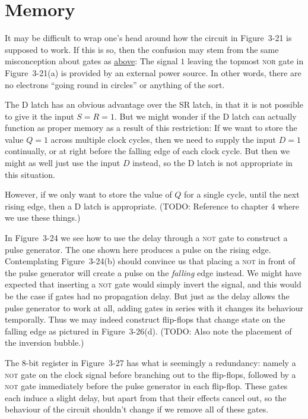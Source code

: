 \documentclass[article, a4paper, 11pt, oneside]{memoir}
\numberwithin{equation}{chapter}
\newcommand{\gate}{\textsc}
\newcommand{\gateNOT}{\gate{not}}
\newcommand{\gateNOR}{\gate{nor}}
\newcommand{\descref}[2]{\hyperref[#1]{#2}}
\begin{document}
\section{Memory}

\begin{notelist}
\item[Latches]
It may be difficult to wrap one's head around how the circuit in Figure~3-21 is supposed to work. If this is so, then the confusion may stem from the same misconception about gates as \descref{note:current-in-out}{above}: The signal $1$ leaving the topmost \gateNOR{} gate in Figure~3-21(a) is provided by an external power source. In other words, there are no electrons \enquote{going round in circles} or anything of the sort.

\item[Usefulness of D latches]
The D latch has an obvious advantage over the SR latch, in that it is not possible to give it the input $S = R = 1$. But we might wonder if the D latch can actually function as proper memory as a result of this restriction: If we want to store the value $Q = 1$ across multiple clock cycles, then we need to supply the input $D = 1$ continually, or at right before the falling edge of each clock cycle. But then we might as well just use the input $D$ instead, so the D latch is not appropriate in this situation.

However, if we only want to store the value of $Q$ for a single cycle, until the next rising edge, then a D latch is appropriate. (TODO: Reference to chapter 4 where we use these things.)

\item[Adding a \gateNOT{} gate to a flip-flop]
In Figure~3-24 we see how to use the delay through a \gateNOT{} gate to construct a pulse generator. The one shown here produces a pulse on the rising edge. Contemplating Figure~3-24(b) should convince us that placing a \gateNOT{} in front of the pulse generator will create a pulse on the \emph{falling} edge instead. We might have expected that inserting a \gateNOT{} gate would simply invert the signal, and this would be the case if gates had no propagation delay. But just as the delay allows the pulse generator to work at all, adding gates in series with it changes its behaviour temporally. Thus we may indeed construct flip-flops that change state on the falling edge as pictured in Figure~3-26(d). (TODO: Also note the placement of the inversion bubble.)

\item[Gates as amplifiers]
The 8-bit register in Figure~3-27 has what is seemingly a redundancy: namely a \gateNOT{} gate on the clock signal before branching out to the flip-flops, followed by a \gateNOT{} gate immediately before the pulse generator in each flip-flop. These gates each induce a slight delay, but apart from that their effects cancel out, so the behaviour of the circuit shouldn't change if we remove all of these gates.


\end{notelist}
\end{document}
